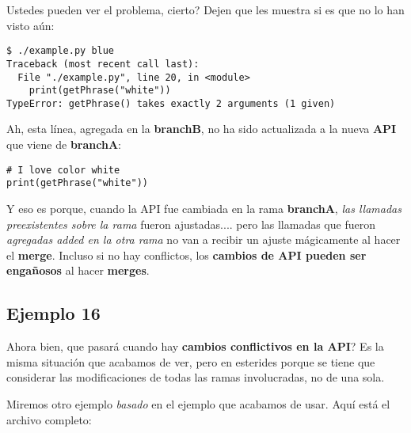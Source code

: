Ustedes pueden ver el problema, cierto? Dejen que les muestra si es que no lo han visto aún:

\begin{lstlisting}[style=console_style,
	basicstyle=\small,
	caption={\bf Ejemplo 15} - tenemos un problema]
$ ./example.py blue
Traceback (most recent call last):
  File "./example.py", line 20, in <module>
    print(getPhrase("white"))
TypeError: getPhrase() takes exactly 2 arguments (1 given)
\end{lstlisting}

Ah, esta línea, agregada en la {\bf branchB}, no ha sido actualizada a la nueva {\bf API } que viene de {\bf branchA}:

\begin{lstlisting}[style=python_style,
	basicstyle=\small,
	firstnumber=19,
	caption={\bf Ejemplo 15} - este es el problema]
# I love color white
print(getPhrase("white"))
\end{lstlisting}

Y eso es porque, cuando la API fue cambiada en la rama {\bf branchA}, {\it las llamadas preexistentes sobre la rama } fueron ajustadas....
pero las llamadas que fueron {\it agregadas added en la otra rama} no van a recibir un ajuste mágicamente al hacer el {\bf merge}.
Incluso si no hay conflictos, los {\bf cambios de API pueden ser engañosos} al hacer {\bf merges}.

\subsection{Ejemplo 16}
\label{example_16}

Ahora bien, que pasará cuando hay {\bf cambios conflictivos en la API}? Es la misma situación que acabamos de ver,
pero en esterides porque se tiene que considerar las modificaciones de todas las ramas involucradas, no de una sola.

Miremos otro ejemplo {\it basado} en el ejemplo que acabamos de usar. Aquí está el archivo completo:

